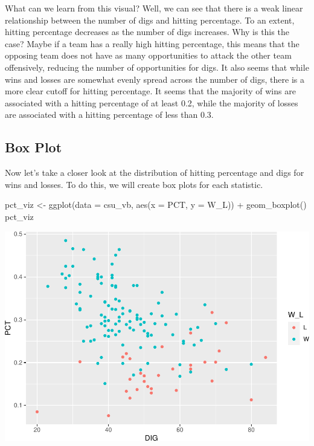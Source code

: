 \documentclass[
  11pt,
]{book}
\newenvironment{Shaded}{\begin{snugshade}}{\end{snugshade}}
\newcommand{\AttributeTok}[1]{\textcolor[rgb]{0.77,0.63,0.00}{#1}}
\newcommand{\FunctionTok}[1]{\textcolor[rgb]{0.00,0.00,0.00}{#1}}
\newcommand{\NormalTok}[1]{#1}
\newcommand{\OtherTok}[1]{\textcolor[rgb]{0.56,0.35,0.01}{#1}}
\newcommand{\SpecialCharTok}[1]{\textcolor[rgb]{0.00,0.00,0.00}{#1}}
\theoremstyle{definition}
\theoremstyle{definition}
\theoremstyle{definition}
\theoremstyle{definition}
\theoremstyle{remark}
\begin{document}
What can we learn from this visual? Well, we can see that there is a weak linear relationship between the number of digs and hitting percentage. To an extent, hitting percentage decreases as the number of digs increases. Why is this the case? Maybe if a team has a really high hitting percentage, this means that the opposing team does not have as many opportunities to attack the other team offensively, reducing the number of opportunities for digs. It also seems that while wins and losses are somewhat evenly spread across the number of digs, there is a more clear cutoff for hitting percentage. It seems that the majority of wins are associated with a hitting percentage of at least 0.2, while the majority of losses are associated with a hitting percentage of less than 0.3.

\hypertarget{box-plot}{%
\subsection{Box Plot}\label{box-plot}}

Now let's take a closer look at the distribution of hitting percentage and digs for wins and losses. To do this, we will create box plots for each statistic.

\begin{Shaded}
\begin{Highlighting}[]
\NormalTok{pct\_viz }\OtherTok{\textless{}{-}} \FunctionTok{ggplot}\NormalTok{(}\AttributeTok{data =}\NormalTok{ csu\_vb, }\FunctionTok{aes}\NormalTok{(}\AttributeTok{x =}\NormalTok{ PCT, }\AttributeTok{y =}\NormalTok{ W\_L)) }\SpecialCharTok{+} \FunctionTok{geom\_boxplot}\NormalTok{()}
\NormalTok{pct\_viz}
\end{Highlighting}
\end{Shaded}

\includegraphics{series_files/figure-latex/unnamed-chunk-33-1.pdf}
\end{document}
